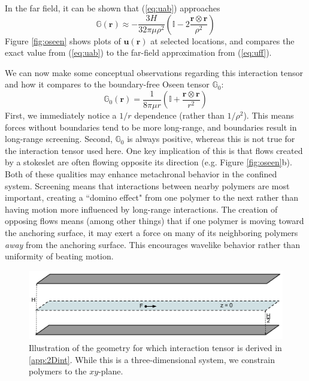 \documentclass[11pt]{ucthesis}
\begin{document}
In the far field, it can be shown that (\ref{eq:uab}) approaches
\begin{equation}
\label{eq:uff}
\mathbb{G}\mathbf{(r)} \approx -\frac{3H}{32\pi\mu\rho^2}\left(\mathbb{I} -2\frac{\mathbf{r\otimes r}}{\rho^2}\right)
\end{equation}
Figure \ref{fig:oseen} shows plots of $\mathbf{u(r)}$ at selected locations, and compares the exact value from (\ref{eq:uab}) to the far-field approximation from (\ref{eq:uff}).

We can now make some conceptual observations regarding this interaction tensor and how it compares to the boundary-free Oseen tensor $\mathbb{G}_0$:
\[
\mathbb{G}_{0}(\mathbf{r}) = \frac{1}{8\pi\mu r}\left(\mathbb{I} + \frac{\mathbf{r\otimes r}}{r^2}\right)
\]
First, we immediately notice a $1/r$ dependence (rather than $1/\rho^2$). This means forces without boundaries tend to be more long-range, and boundaries result in long-range screening. Second, $\mathbb{G}_{0}$ is always positive, whereas this is not true for the interaction tensor used here. One key implication of this is that flows created by a stokeslet are often flowing opposite its direction (e.g. Figure \ref{fig:oseen}b). Both of these qualities may enhance metachronal behavior in the confined system. Screening means that interactions between nearby polymers are most important, creating a ``domino effect" from one polymer to the next rather than having motion more influenced by long-range interactions. The creation of opposing flows means (among other things) that if one polymer is moving toward the anchoring surface, it may exert a force on many of its neighboring polymers \textit{away} from the anchoring surface. This encourages wavelike behavior rather than uniformity of beating motion.


\begin{figure}
\begin{center}
\includegraphics[width = \textwidth]{2plates}
\caption{Illustration of the geometry for which interaction tensor
is derived in \ref{app:2Dint}. While this is a three-dimensional
system, we constrain polymers to the $xy$-plane. 
\label{fig:schem}}
\end{center}
\end{figure}
\end{document}
